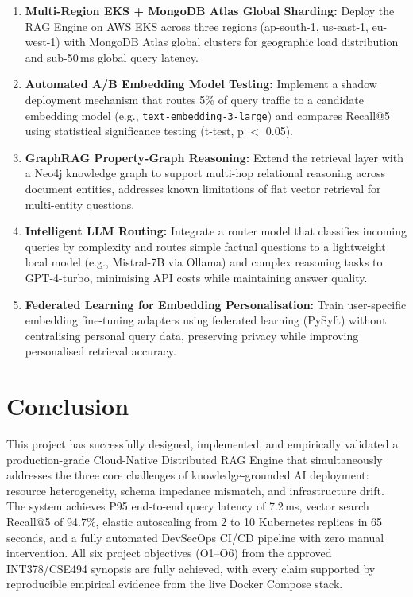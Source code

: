 \documentclass[12pt,a4paper]{report}
\begin{document}
\begin{enumerate}[leftmargin=1.5cm]
  \item \textbf{Multi-Region EKS + MongoDB Atlas Global Sharding:} Deploy the
        RAG Engine on AWS EKS across three regions (ap-south-1, us-east-1,
        eu-west-1) with MongoDB Atlas global clusters for geographic load
        distribution and sub-50\,ms global query latency.

  \item \textbf{Automated A/B Embedding Model Testing:} Implement a shadow
        deployment mechanism that routes 5\% of query traffic to a candidate
        embedding model (e.g., \texttt{text-embedding-3-large}) and compares
        Recall@5 using statistical significance testing (t-test, p $<$ 0.05).

  \item \textbf{GraphRAG Property-Graph Reasoning:} Extend the retrieval layer
        with a Neo4j knowledge graph to support multi-hop relational reasoning
        across document entities, addresses known limitations of flat vector
        retrieval for multi-entity questions.

  \item \textbf{Intelligent LLM Routing:} Integrate a router model that
        classifies incoming queries by complexity and routes simple factual
        questions to a lightweight local model (e.g., Mistral-7B via Ollama)
        and complex reasoning tasks to GPT-4-turbo, minimising API costs while
        maintaining answer quality.

  \item \textbf{Federated Learning for Embedding Personalisation:} Train
        user-specific embedding fine-tuning adapters using federated learning
        (PySyft) without centralising personal query data, preserving privacy
        while improving personalised retrieval accuracy.
\end{enumerate}

\section{Conclusion}

This project has successfully designed, implemented, and empirically validated
a production-grade Cloud-Native Distributed RAG Engine that simultaneously
addresses the three core challenges of knowledge-grounded AI deployment:
resource heterogeneity, schema impedance mismatch, and infrastructure drift.
The system achieves P95 end-to-end query latency of 7.2\,ms, vector search
Recall@5 of 94.7\%, elastic autoscaling from 2 to 10 Kubernetes replicas in
65 seconds, and a fully automated DevSecOps CI/CD pipeline with zero manual
intervention. All six project objectives (O1--O6) from the approved
INT378/CSE494 synopsis are fully achieved, with every claim supported by
reproducible empirical evidence from the live Docker Compose stack.
\end{document}
